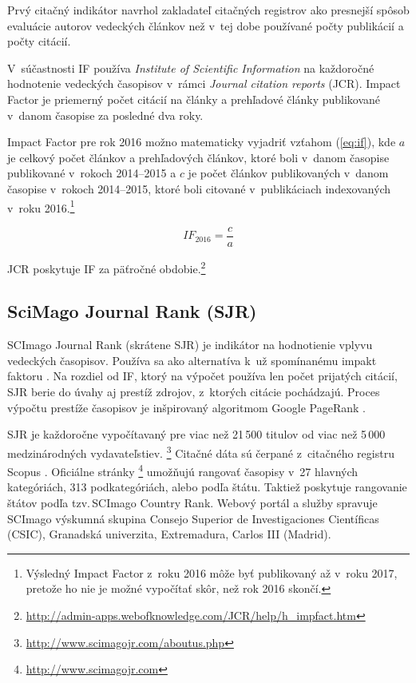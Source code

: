 Prvý citačný indikátor navrhol zakladateľ citačných registrov
\citet{Garfield1955} ako presnejší spôsob evaluácie autorov vedeckých článkov
než v~tej dobe používané počty publikácií a počty citácií.

V~súčastnosti IF používa \emph{Institute of Scientific Information} na
každoročné hodnotenie vedeckých časopisov v~rámci \emph{Journal citation
reports} (JCR).  Impact Factor je priemerný počet citácií na články a
prehľadové články publikované v~danom časopise za posledné dva roky.

Impact Factor pre rok 2016 možno matematicky vyjadriť vzťahom (\ref{eq:if}),
kde $a$ je celkový počet článkov a prehľadových článkov, ktoré boli v~danom
časopise publikované v~rokoch 2014--2015 a $c$ je počet článkov publikovaných
v~danom časopise v~rokoch 2014--2015, ktoré boli citované v~publikáciach
indexovaných v~roku 2016.\footnote{Výsledný Impact Factor z~roku 2016 môže byť
publikovaný až v~roku 2017, pretože ho nie je možné vypočítať skôr, než rok
2016 skončí.}

\begin{equation}
\label{eq:if}
\mathit{IF}_{2016} = \frac{c}{a}
\end{equation}

\noindent JCR poskytuje IF za päťročné obdobie.\footnote{\url{http://admin-apps.webofknowledge.com/JCR/help/h_impfact.htm}}

\subsection{SciMago Journal Rank (SJR)}
\label{sec:sjr}

SCImago Journal Rank (skrátene SJR) je indikátor na hodnotienie vplyvu
vedeckých časopisov. Používa sa ako alternatíva k~už spomínanému impakt faktoru
\citep{Falagas2008}.  Na rozdiel od IF, ktorý na výpočet používa len počet prijatých
citácií, SJR berie do úvahy aj prestíž zdrojov, z~ktorých citácie pochádzajú.
Proces výpočtu prestíže časopisov \citep{GuerreroBote2012} je inšpirovaný algoritmom
Google PageRank\texttrademark{} \citep{Page1999}.

SJR je každoročne vypočítavaný pre viac než 21\,500 titulov od viac než 5\,000
medzinárodných vydavateľstiev.
\footnote{\url{http://www.scimagojr.com/aboutus.php}} Citačné dáta sú čerpané
z~citačného registru Scopus \textregistered. Oficiálne stránky
\footnote{\url{http://www.scimagojr.com}} umožňujú rangovať časopisy v~27
hlavných kategóriách, 313 podkategóriách, alebo podľa štátu.  Taktiež poskytuje
rangovanie štátov podľa tzv.\,SCImago Country Rank.  Webový portál a služby
spravuje SCImago výskumná skupina Consejo Superior de Investigaciones
Científicas (CSIC), Granadská univerzita, Extremadura, Carlos III (Madrid).


